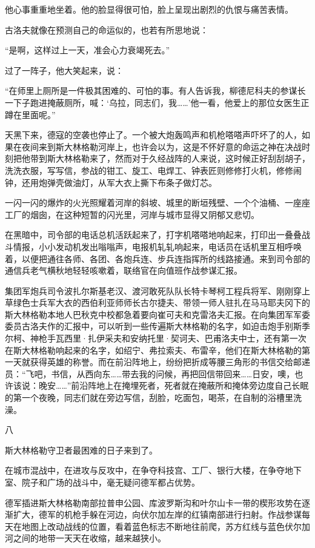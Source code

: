 他心事重重地坐着。他的脸显得很可怕，脸上呈现出剧烈的仇恨与痛苦表情。

古洛夫就像在预测自己的命运似的，也若有所思地说：

“是啊，这样过上一天，准会心力衰竭死去。”

过了一阵子，他大笑起来，说：

“在师里上厕所是一件极其困难的、可怕的事。有人告诉我，柳德尼科夫的参谋长一下子跑进掩蔽厕所，喊：‘乌拉，同志们，我……’他一看，他爱上的那位女医生正蹲在里面呢。”

天黑下来，德寇的空袭也停止了。一个被大炮轰鸣声和机枪嗒嗒声吓坏了的人，如果在夜间来到斯大林格勒河岸上，也许会以为，这是不怀好意的命运之神在决战时刻把他带到斯大林格勒来了，然而对于久经战阵的人来说，这时候正好刮刮胡子，洗洗衣服，写写信，参战的钳工、旋工、电焊工、钟表匠则修修打火机，修修闹钟，还用炮弹壳做油灯，从军大衣上撕下布条子做灯芯。

一闪一闪的爆炸的火光照耀着河岸的斜坡、城里的断垣残壁、一个个油桶、一座座工厂的烟囱，在这种短暂的闪光里，河岸与城市显得又阴郁又悲切。

在黑暗中，司令部的电话总机活跃起来了，打字机嗒嗒地响起来，打印出一叠叠战斗情报，小小发动机发出嗡嗡声，电报机轧轧响起来，电话员在话机里互相呼唤着，以便把通往各师、各团、各炮兵连、步兵连指挥所的线路接通。来到司令部的通信兵老气横秋地轻轻咳嗽着，联络官在向值班作战参谋汇报。

集团军炮兵司令波扎尔斯基老汉、渡河敢死队队长特卡琴柯工程兵将军、刚刚穿上草绿色士兵军大衣的西伯利亚师师长古尔捷夫、带领一师人驻扎在马马耶夫冈下的斯大林格勒本地人巴秋克中校都急着要向崔可夫和克雷洛夫汇报。在向集团军军委委员古洛夫作的汇报中，可以听到一些传遍斯大林格勒的名字，如迫击炮手别斯季尔柯、神枪手瓦西里·扎伊采夫和安纳托里·契诃夫、巴甫洛夫中士，还有第一次在斯大林格勒响起来的名字，如绍宁、弗拉索夫、布雷辛，他们在斯大林格勒的第一天就获得英雄的称誉。而在前沿阵地上，纷纷把折成等腰三角形的书信交给邮递员：“飞吧，书信，从西向东……带去我的问候，再把回信带回来……日安，噢，也许该说：晚安……”前沿阵地上在掩埋死者，死者就在掩蔽所和掩体旁边度自己长眠的第一个夜晚，同志们就在旁边写信，刮脸，吃面包，喝茶，在自制的浴槽里洗澡。

八

斯大林格勒守卫者最困难的日子来到了。

在城市混战中，在进攻与反攻中，在争夺科技宫、工厂、银行大楼，在争夺地下室、院子和广场的战斗中，毫无疑问德军都占优势。

德军插进斯大林格勒南部拉普申公园、库波罗斯沟和叶尔山卡一带的楔形攻势在逐渐扩大，德军的机枪手躲在河边，向伏尔加左岸的红镇南部进行扫射。作战参谋每天在地图上改动战线的位置，看着蓝色标志不断地往前爬，苏方红线与蓝色伏尔加河之间的地带一天天在收缩，越来越狭小。

